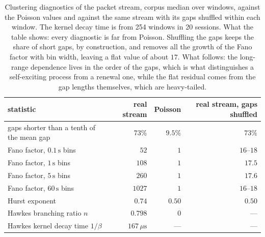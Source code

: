 \documentclass[11pt]{article}
\begin{document}
\begin{table}[H]
\centering
\small
\begin{tabular}{@{}lrrr@{}}
\toprule
statistic & real stream & Poisson & real stream, gaps shuffled \\
\midrule
gaps shorter than a tenth of the mean gap & $73\%$ & $9.5\%$ & $73\%$ \\
Fano factor, $0.1\,\mathrm{s}$ bins & $52$ & $1$ & $16$--$18$ \\
Fano factor, $1\,\mathrm{s}$ bins & $108$ & $1$ & $17.5$ \\
Fano factor, $5\,\mathrm{s}$ bins & $260$ & $1$ & $17.6$ \\
Fano factor, $60\,\mathrm{s}$ bins & $1027$ & $1$ & $16$--$18$ \\
Hurst exponent & $0.74$ & $0.50$ & $0.50$ \\
Hawkes branching ratio $n$ & $0.798$ & $0$ & --- \\
Hawkes kernel decay time $1/\beta$ & $167\,\mu\mathrm{s}$ & --- & --- \\
\bottomrule
\end{tabular}
\caption{Clustering diagnostics of the packet stream, corpus median over windows, against
the Poisson values and against the same stream with its gaps shuffled within each window.
The kernel decay time is from 254 windows in 20 sessions. What the table shows: every
diagnostic is far from Poisson. Shuffling the gaps keeps the share of short gaps, by
construction, and removes all the growth of the Fano factor with bin width, leaving a flat
value of about $17$. What follows: the long-range dependence lives in the order of the
gaps, which is what distinguishes a self-exciting process from a renewal one, while the
flat residual comes from the gap lengths themselves, which are heavy-tailed.}
\label{tab:hawkes-diag}
\end{table}
\end{document}
